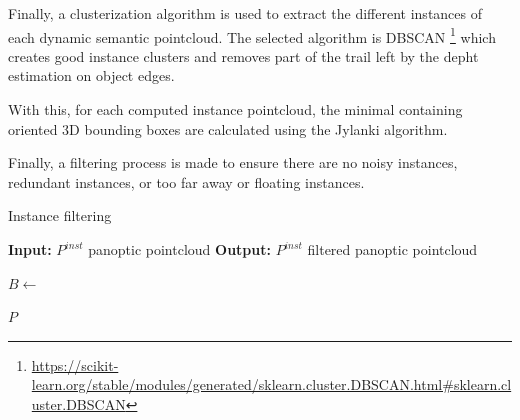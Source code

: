 Finally, a clusterization algorithm is used to extract the different instances of each dynamic semantic pointcloud. The selected algorithm is DBSCAN \footnote{\url{https://scikit-learn.org/stable/modules/generated/sklearn.cluster.DBSCAN.html#sklearn.cluster.DBSCAN}} which creates good instance clusters and removes part of the trail left by the depht estimation on object edges.

With this, for each computed instance pointcloud, the minimal containing oriented 3D bounding boxes are calculated using the Jylanki algorithm.

Finally, a filtering process is made to ensure there are no noisy instances, redundant instances, or too far away or floating instances.


\begin{algorithm}
    \caption{Instance filtering}
    \label{algorithm:instance_filter}
    \footnotesize

    \begin{algorithmic}[1]
        \State \textbf{Input:} $P^{inst}$ panoptic pointcloud
        \State \textbf{Output:} $P^{inst}$ filtered panoptic pointcloud
        
                \State $B \gets $
            
            \EndFor
        \EndFor
        
        \State \Return $P$
    \end{algorithmic}
\end{algorithm}



